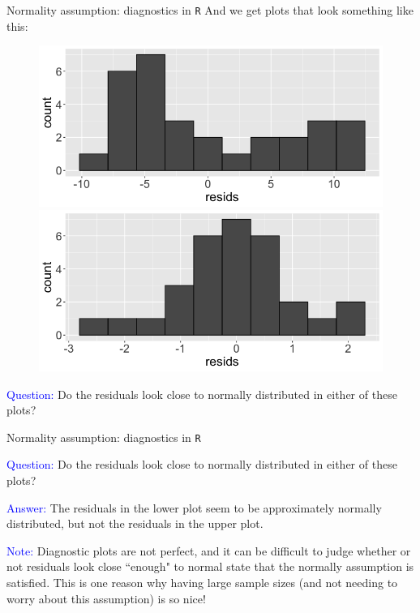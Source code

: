 \documentclass[10pt,t]{beamer}
\begin{document}
\begin{frame}{Normality assumption: diagnostics in \texttt{R}}
And we get plots that look something like this:

	
\begin{figure}
	\centering 
	\includegraphics[scale=0.2]{hist_resid1.png} \\
    \includegraphics[scale=0.2]{hist_resid2.png}
\end{figure}

\textcolor{blue}{Question:} Do the residuals look close to normally distributed in either of these plots?

\end{frame}

\begin{frame}{Normality assumption: diagnostics in \texttt{R}}

\textcolor{blue}{Question:} Do the residuals look close to normally distributed in either of these plots?

\vspace{0.3cm}

\textcolor{blue}{Answer:} The residuals in the lower plot seem to be approximately normally distributed, but not the residuals in the upper plot.

\vspace{0.3cm}

\textcolor{blue}{Note:} Diagnostic plots are not perfect, and it can be difficult to judge whether or not residuals look close ``enough" to normal state that the normally assumption is satisfied. This is one reason why having large sample sizes (and not needing to worry about this assumption) is so nice!

\end{frame}
\end{document}
